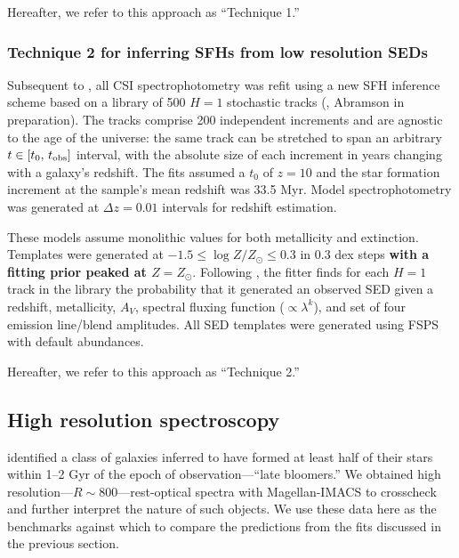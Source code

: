 \documentclass[a4paper,fleqn,usenatbib]{mnras}
\newcommand{\logZ}{\log Z/Z_{\odot}}
\newcommand{\bfr}{\bf\color{red}}
\newcommand{\tobs}{t_{\rm obs}}
\begin{document}
Hereafter, we refer to this approach as ``Technique 1.''

\subsubsection{Technique 2 for inferring SFHs from low resolution SEDs}
\label{sec:h1}

Subsequent to \citet{Dressler18}, all CSI spectrophotometry was refit using a new 
SFH inference scheme based on a library of 500 $H=1$ stochastic tracks
(\citealt{Kelson14,Kelson16,Kelson20}, Abramson in preparation). The tracks comprise 200 
independent increments and are agnostic to the age of the universe: the same track can be stretched 
to span an arbitrary $t\in[t_{0},\,\tobs]$ interval, with the absolute size of each increment in years 
changing with a galaxy's redshift. The fits assumed a $t_{0}$ of $z=10$ and the star formation 
increment at the sample's mean redshift was 33.5 Myr. Model spectrophotometry was
generated at $\Delta z = 0.01$ intervals for redshift estimation.

These models assume monolithic values for both metallicity and extinction. Templates were generated
at $-1.5\leq\logZ\leq0.3$ in 0.3 dex steps {\bfr with a fitting prior peaked at $Z=Z_{\odot}$}. Following 
\citealt{Pacifici12}, the fitter finds for each $H=1$ track in the library the probability that it generated
an observed SED given a redshift, metallicity, $A_{V}$, spectral fluxing function 
({\bfr $\propto \lambda^{k}$}), and set of four emission line/blend amplitudes. All SED templates 
were generated using FSPS with default abundances.

Hereafter, we refer to this approach as ``Technique 2.''

\subsection{High resolution spectroscopy}
\label{sec:hiRes}

\citet{Dressler16, Dressler18} identified a class of galaxies inferred to have formed at least half of 
their stars within 1--2 Gyr of the epoch of observation---``late bloomers.'' We obtained high 
resolution---$R\sim800$---rest-optical spectra with Magellan-IMACS to crosscheck and further 
interpret the nature of such objects. We use these data here as the benchmarks against which to
compare the predictions from the fits discussed in the previous section.
\end{document}
